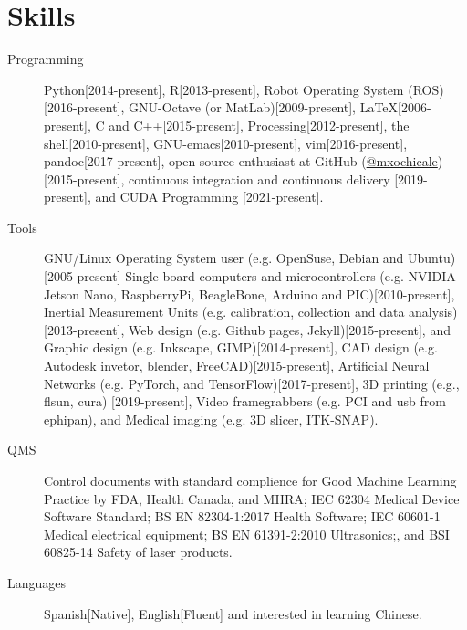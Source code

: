 \documentclass{mycv}
\begin{document}
\section{Skills}
\begin{description}

\item[Programming] Python[2014-present],
R[2013-present], 
Robot Operating System (ROS)[2016-present],
GNU-Octave (or MatLab)[2009-present],
\LaTeX [2006-present], 
C and C++[2015-present],
Processing[2012-present], 
the shell[2010-present], 
GNU-emacs[2010-present],
vim[2016-present], 
pandoc[2017-present],
open-source enthusiast at GitHub (\href{https://github.com/mxochicale}{@mxochicale})[2015-present], 
continuous integration and continuous delivery [2019-present], 
and CUDA Programming [2021-present].

\item[Tools] 
GNU/Linux Operating System user (e.g. OpenSuse, Debian and Ubuntu)[2005-present]
Single-board computers and microcontrollers (e.g. 
NVIDIA Jetson Nano, RaspberryPi, BeagleBone, Arduino and PIC)[2010-present],
Inertial Measurement Units (e.g. calibration, collection and data analysis)[2013-present], 
Web design (e.g. Github pages, Jekyll)[2015-present], and
Graphic design (e.g. Inkscape, GIMP)[2014-present],
CAD design (e.g. Autodesk invetor, blender, FreeCAD)[2015-present], 
Artificial Neural Networks (e.g. PyTorch, and TensorFlow)[2017-present], 
3D printing (e.g., flsun, cura) [2019-present], 
Video framegrabbers (e.g. PCI and usb from ephipan), and 
Medical imaging (e.g. 3D slicer, ITK-SNAP).

\item[QMS] 
Control documents with standard complience for
Good Machine Learning Practice by FDA, Health Canada, and MHRA;
IEC 62304 Medical Device Software Standard;
BS EN 82304-1:2017 Health Software;
IEC 60601-1 Medical electrical equipment; 
BS EN 61391-2:2010 Ultrasonics;, and
BSI 60825-14 Safety of laser products.

\item[Languages] Spanish[Native], English[Fluent] and interested in learning Chinese.
 
\end{description}

\end{document}

